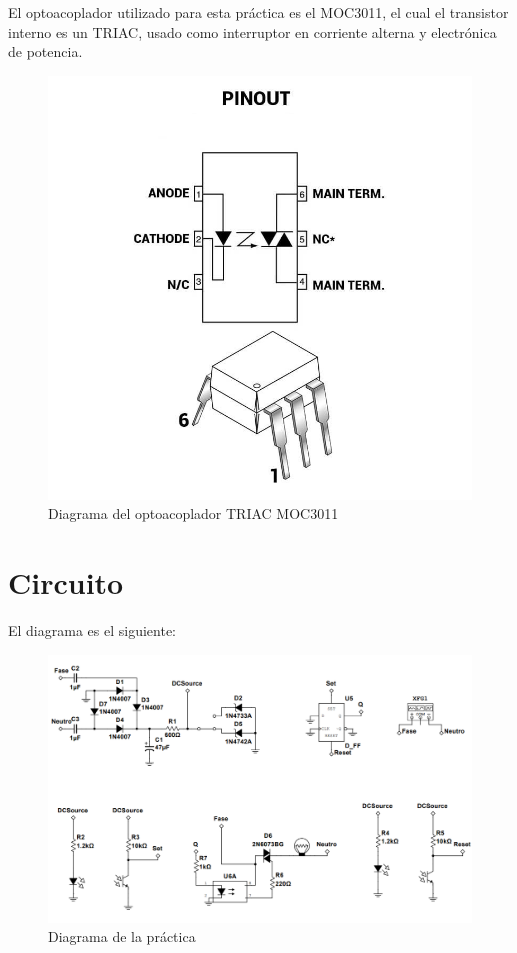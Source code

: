 \documentclass{article}
\begin{document}
El optoacoplador utilizado para esta práctica es el MOC3011, el cual el transistor interno es un TRIAC, usado como interruptor
en corriente alterna y electrónica de potencia.

\begin{figure}
    \centering
    \includegraphics[scale=0.15]{MOC3011.jpg}
    \caption{Diagrama del optoacoplador TRIAC MOC3011}
    \label{Fig: Diagrama del optoacoplador TRIAC MOC3011}
\end{figure}

\section{Circuito}

El diagrama es el siguiente:

\begin{figure}[h]
    \centering
    \includegraphics[scale=0.4]{Circuito.png}
    \caption{Diagrama de la práctica}
    \label{Fig: Diagrama de la práctica}
\end{figure}
\end{document}
